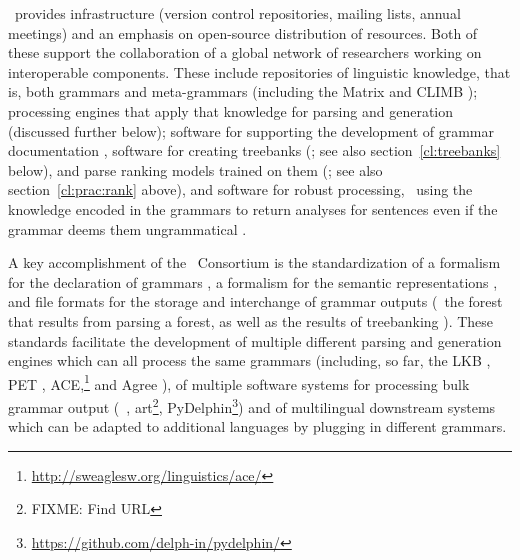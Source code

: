 \documentclass[output=paper,nonflat]{langsci/langscibook}
\begin{document}
\delphin\ provides infrastructure (version control repositories,
mailing lists, annual meetings) and an emphasis on open-source
distribution of resources. Both of these support the collaboration of a
global network of researchers working on interoperable
components. These include repositories of linguistic knowledge, that
is, both grammars and meta-grammars (including the Matrix and CLIMB
\citep{Fokkens:14}); processing engines that apply that
knowledge for parsing and generation (discussed further below);
software for supporting the development of grammar documentation
\citep[\eg][]{Hashimoto-etal:07}, software for creating treebanks
(\citealt{OFTM2004a-u,Packard:15}; see also section~\ref{cl:treebanks} below), 
and parse ranking models trained on them
(\citealt{Tou:Man:Fli:Oep:05}; see also section~\ref{cl:prac:rank} above), and
software for robust processing, \ie\ using the knowledge encoded in
the grammars to return analyses for sentences even if the grammar
deems them ungrammatical
\citep{jigsaw,buys2017parse,chen2018parse}.

A key accomplishment of the \delphin\ Consortium is the standardization
of a formalism for the declaration of grammars
\citep{Copestake:02:CLE}, a formalism for the semantic representations
\citep{CFPS2005a}, and file formats for the storage and interchange of
grammar outputs (\eg\ the forest that results from parsing a forest,
as well as the results of treebanking \citep{Oepen:01,OFTM2004a-u}).
These standards facilitate the development of multiple different
parsing and generation engines which can all process the same grammars
(including, so far, the LKB \citep{Copestake2002a}, PET
\citep{callmeier00},
ACE,\footnote{\url{http://sweaglesw.org/linguistics/ace/}} and Agree
\citep{Slayden2012a-u}), of multiple software systems for processing
bulk grammar output (\itsdb\ \citep{Oepen:01}, art\footnote{FIXME: Find URL}, PyDelphin\footnote{%
	\url{https://github.com/delph-in/pydelphin/}
})
and of multilingual downstream systems which can be adapted to additional
languages by plugging in different grammars.
\end{document}
